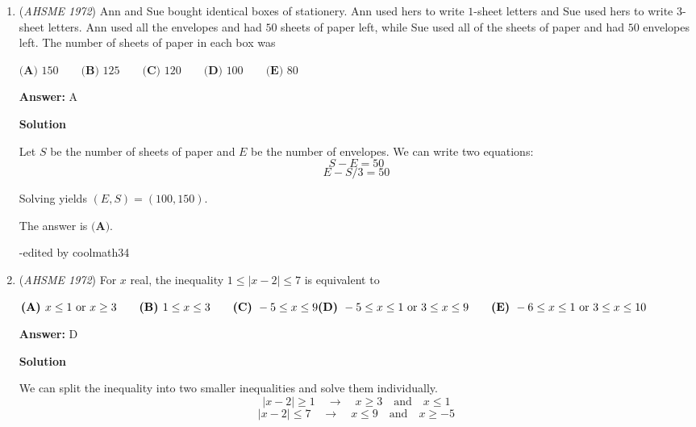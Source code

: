 \begin{enumerate}
 \textbf{Answer: }D



\textbf{Solution}

We have two cases: $x$ is positive and $x$ is negative.
 \[\text{Positive} \qquad x - \log y = x + \log y \qquad \rightarrow \qquad 2\log y = 0 \rightarrow y = 1\]
 \[\text{Negative} \qquad -x + \log y = x + \log y \qquad \rightarrow \qquad 2x = 0 \rightarrow x = 0\]

 We can write $x(y-1)=0$ to show that $x=0, y=1,$ or both.

 The answer is $\textbf{(D)}.$

 -edited by coolmath34

 


	\item (\textit{AHSME 1972}) Ann and Sue bought identical boxes of stationery. Ann used hers to write $1$-sheet letters and Sue used hers to write $3$-sheet letters. 
Ann used all the envelopes and had $50$ sheets of paper left, while Sue used all of the sheets of paper and had $50$ envelopes left. 
The number of sheets of paper in each box was 


 $\textbf{(A) } 150 \qquad \textbf{(B) } 125 \qquad \textbf{(C) } 120 \qquad \textbf{(D) } 100 \qquad     \textbf{(E) } 80 \qquad$

 \textbf{Answer: }A



\textbf{Solution}

Let $S$ be the number of sheets of paper and $E$ be the number of envelopes. We can write two equations:
 \[S - E = 50\]
 \[E - S/3 = 50\]

 Solving yields $(E, S) = (100, 150).$

 The answer is $\textbf{(A)}.$

 -edited by coolmath34

 


	\item (\textit{AHSME 1972}) For $x$ real, the inequality $1\le |x-2|\le 7$ is equivalent to


 $\textbf{(A) }x\le 1\text{ or }x\ge 3\qquad \textbf{(B) }1\le x\le 3\qquad \textbf{(C) }-5\le x\le 9\qquad \\ \textbf{(D) }-5\le x\le 1\text{ or }3\le x\le 9\qquad  \textbf{(E) }-6\le x\le 1\text{ or }3\le x\le 10$

 \textbf{Answer: }D



\textbf{Solution}

We can split the inequality into two smaller inequalities and solve them individually.
 \[|x-2| \ge 1 \quad \rightarrow \quad x \ge 3 \quad \text{and} \quad x \le 1\]
 \[|x-2| \le 7 \quad \rightarrow \quad x \le 9 \quad \text{and} \quad x \ge -5\]


\end{enumerate}

